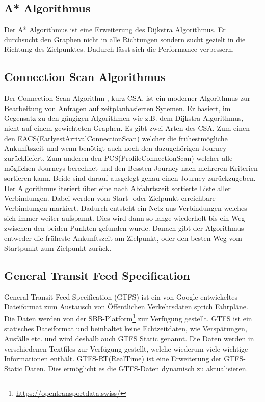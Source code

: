 \subsection{A* Algorithmus}
Der A* Algorithmus \cite{dij_a} ist eine Erweiterung des Dijkstra Algorithmus. Er durchsucht den Graphen nicht in alle Richtungen sondern sucht gezielt in die Richtung des Zielpunktes. Dadurch lässt sich die Performance verbessern.

\subsection{Connection Scan Algorithmus}
Der Connection Scan Algorithm \cite{csa} , kurz CSA,  ist ein moderner Algorithmus zur Bearbeitung von Anfragen auf zeitplanbasierten Sytemen. Er basiert, im Gegensatz zu den gängigen Algorithmen wie z.B. dem Dijkstra-Algorithmus, nicht auf einem gewichteten Graphen. 
Es gibt zwei Arten des CSA. Zum einen den EACS(EarlyestArrivalConnectionScan) welcher die frühestmögliche Ankunftszeit und wenn benötigt auch noch den dazugehörigen Journey zurückliefert. Zum anderen den PCS(ProfileConnectionScan) welcher alle möglichen Journeys berechnet und den Bessten Journey nach mehreren Kriterien sortieren kann. Beide sind darauf ausgelegt genau einen Journey zurückzugeben.
Der Algorithmus iteriert über eine nach Abfahrtszeit sortierte Liste aller Verbindungen. Dabei werden vom Start- oder Zielpunkt erreichbare Verbindungen markiert. Dadurch entsteht ein Netz aus Verbindungen welches sich immer weiter aufspannt. Dies wird dann so lange wiederholt bis ein Weg zwischen den beiden Punkten gefunden wurde. Danach gibt der Algorithmus entweder die früheste Ankunftszeit am Zielpunkt, oder den besten Weg vom Startpunkt zum Zielpunkt zurück.




 

\subsection{General Transit Feed Specification}
General Transit Feed Specification (GTFS)\cite{gtfsinhalt }\cite{gtfs} ist ein von Google entwickeltes Dateiformat zum Austausch von Öffentlichen Verkehrsdaten sprich Fahrpläne. Die Daten werden von der SBB-Platform\footnote{\url{https://opentransportdata.swiss/}} zur Verfügung gestellt. GTFS ist ein statisches Dateiformat und beinhaltet keine Echtzeitdaten, wie Verspätungen, Ausfälle etc. und wird deshalb auch GTFS Static genannt. Die Daten werden in verschiedenen Textfiles zur Verfügung gestellt, welche wiederum viele wichtige Informationen enthält. GTFS-RT(RealTime) ist eine Erweiterung der GTFS-Static Daten. Dies ermöglicht es die GTFS-Daten dynamisch zu aktualisieren. \cite{gtfs-rt-google} \newline

